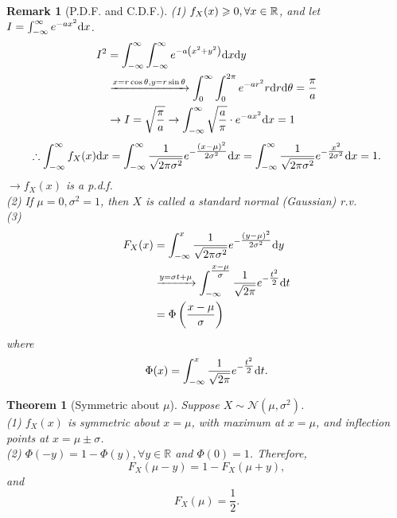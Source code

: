 \documentclass[openany,12pt]{book}
\newtheorem{theorem}{Theorem}[chapter]
\newtheorem{remark}{Remark}[chapter]
\begin{document}
\begin{remark}[P.D.F. and C.D.F.]
  (1) $f_X(x)\geqslant0, \forall x\in\mathbb{R}$, and let $I=\int_{-\infty}^{\infty}e^{-ax^2}\mathrm{d} x$.
  $$\begin{aligned}
      I^2 & =\int_{-\infty}^{\infty}\int_{-\infty}^{\infty}{e^{-a\left(x^2+y^2\right)}\mathrm{d} x\mathrm{d} y}                             \\
          & \xrightarrow{x=r\cos\theta,y=r\sin\theta}\int_{0}^{\infty}\int_{0}^{2\pi}{e^{-ar^2}r\mathrm{d} r\mathrm{d}\theta}=\frac{\pi}{a} \\
          & \to I=\sqrt{\frac{\pi}{a}}\to\int_{-\infty}^{\infty}{\sqrt{\frac{a}{\pi}}}\cdot e^{-ax^2}\mathrm{d} x=1
    \end{aligned}
  $$
  $$
    \therefore
    \int_{-\infty}^{\infty}{f_X(x)}\mathrm{d} x
    =\int_{-\infty}^{\infty}{\frac{1}{\sqrt{2\pi\sigma^2}}e^{-\tfrac{(x-\mu)^2}{2\sigma^2}}}\mathrm{d} x
    =\int_{-\infty}^{\infty}{\frac{1}{\sqrt{2\pi\sigma^2}}e^{-\tfrac{x^2}{2\sigma^2}}}\mathrm{d} x
    =1.
  $$
  $\to f_X(x)$ is a p.d.f.\\
  (2) If $\mu=0, \sigma^2=1$, then $X$ is called a standard normal (Gaussian) r.v.\\
  (3)
  $$\begin{aligned}
      F_X(x) & =\int_{-\infty}^{x}{\frac{1}{\sqrt{2\pi\sigma^2}}e^{-\tfrac{(y-\mu)^2}{2\sigma^2}}}\mathrm{d} y                            \\
             & \xrightarrow{y=\sigma t+\mu}\int_{-\infty}^{\tfrac{x-\mu}{\sigma}}{\frac{1}{\sqrt{2\pi}}e^{-\tfrac{{t}^2}{2}}}\mathrm{d} t \\
             & ={\Phi}\left(\frac{x-\mu}{\sigma}\right)                                                                             \\
    \end{aligned}
  $$
  where
  $$
    {\Phi}(x)=\int_{-\infty}^{x}{\frac{1}{\sqrt{2\pi}}e^{-\tfrac{{t}^2}{2}}}\mathrm{d} t.
  $$
\end{remark}

\begin{theorem}[Symmetric about ${\mu}$]
  Suppose $X\sim \mathcal{N}(\mu,\sigma^2)$.\\
  (1) $f_X(x)$ is symmetric about $x=\mu$, with maximum at $x=\mu$, and inflection points at $x=\mu\pm\sigma$.\\
  (2) $\Phi\left(-y\right)=1-{\Phi}(y), \forall y\in\mathbb{R}$ and $\Phi\left(0\right)=1$. Therefore, $$F_X\left(\mu-y\right)=1-F_X\left(\mu+y\right),$$ and $$F_X\left(\mu\right)=\frac{1}{2}.$$
\end{theorem}
\end{document}
